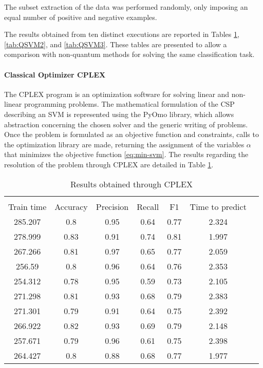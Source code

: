 The subset extraction of the data was performed randomly, only imposing an equal number of positive and negative examples.

The results obtained from ten distinct executions are reported in Tables \ref{tab:QSVM1}, \ref{tab:QSVM2}, and \ref{tab:QSVM3}. These tables are presented to allow a comparison with non-quantum methods for solving the same classification task.

\paragraph{Classical Optimizer CPLEX} The CPLEX program\cite{cplex} is an optimization software for solving linear and non-linear programming problems. The mathematical formulation of the CSP describing an SVM is represented using the PyOmo library, which allows abstraction concerning the chosen solver and the generic writing of problems. Once the problem is formulated as an objective function and constraints, calls to the optimization library are made, returning the assignment of the variables $\alpha$ that minimizes the objective function \ref{eq:min-svm}. The results regarding the resolution of the problem through CPLEX are detailed in Table \ref{tab:QSVM1}.

\begin{table}[h]
    \centering
    \begin{tabular}{ccccccc}
    \toprule                                                             \\                    
    Train time & Accuracy & Precision & Recall & F1    & Time to predict \\
    \midrule
    285.207    & 0.8      & 0.95      & 0.64   & 0.77  & 2.324           \\
    278.999    & 0.83     & 0.91      & 0.74   & 0.81  & 1.997           \\
    267.266    & 0.81     & 0.97      & 0.65   & 0.77  & 2.059           \\
    256.59     & 0.8      & 0.96      & 0.64   & 0.76  & 2.353           \\
    254.312    & 0.78     & 0.95      & 0.59   & 0.73  & 2.105           \\
    271.298    & 0.81     & 0.93      & 0.68   & 0.79  & 2.383           \\
    271.301    & 0.79     & 0.91      & 0.64   & 0.75  & 2.392           \\
    266.922    & 0.82     & 0.93      & 0.69   & 0.79  & 2.148           \\
    257.671    & 0.79     & 0.96      & 0.61   & 0.75  & 2.398           \\
    264.427    & 0.8      & 0.88      & 0.68   & 0.77  & 1.977           \\
    \bottomrule
    \end{tabular}
    \caption{Results obtained through CPLEX}
    \label{tab:QSVM1}
\end{table}

